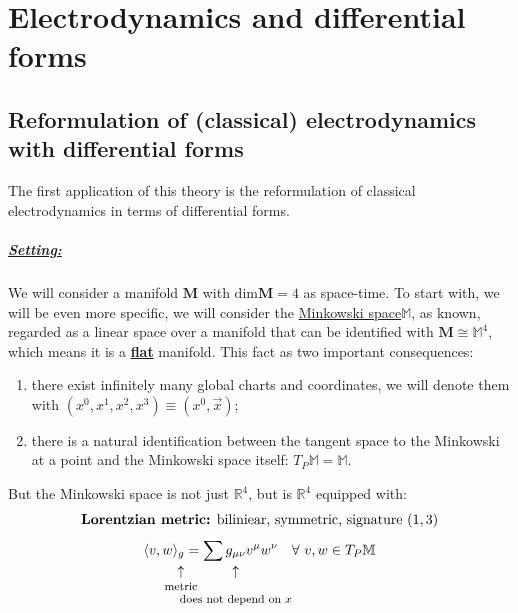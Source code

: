 \documentclass[../main.tex]{subfiles}
\begin{document}
\setchapterpreamble[u]{\margintoc}
\chapter[Electrodynamics and differential forms]{Electrodynamics and differential forms}
\section[Reformulation of electrodynamics with differential forms]{Reformulation of (classical) electrodynamics with differential forms}
The first application of this theory is the reformulation of classical electrodynamics in terms of differential forms.
\paragraph{\underline{Setting:}} We will consider a manifold  $\mathbf{M}$ with {\color{red}$\textrm{dim}\mathbf{M}=4$} as space-time. To start with, we will be even more specific, we will consider the \href{https://it.wikipedia.org/wiki/Spaziotempo_di_Minkowski}{Minkowski space}$\mathbb{M}$, as known, regarded as a linear space over a manifold that can be identified with $\mathbf{M}\cong\mathbb{M}^4$, which means it is a \underline{\textbf{flat}} manifold. This fact as two important consequences:
\begin{enumerate}
    \item there exist infinitely many global charts and coordinates, we will denote them with $\left(x^0,x^1,x^2,x^3\right)\equiv \left(x^0,\vec{x}\right)$;
    \item there is a natural identification
    between the tangent space to the Minkowski at a point and the Minkowski space itself: $T_P\mathbb{M}=\mathbb{M}$.
\end{enumerate}
But the Minkowski space is not just $\mathbb{R}^4$, but is $\mathbb{R}^4$ equipped with:
\[
\textrm{\textbf{Lorentzian metric:} biliniear, symmetric, signature} \ (1,3)
\]
\[
\langle v,w\rangle_{\underset{\mathclap{\tikz \node {$\uparrow$} node [below=1ex] {\footnotesize metric};}}{g}}=\sum\underset{\mathclap{\tikz \node {$\uparrow$} node [below=3ex] {\footnotesize does not depend on $x$};}}{g_{\mu\nu}}v^\mu w^\nu \quad \forall \ v,w \in T_P\mathbb{M}
\]
\end{document}
